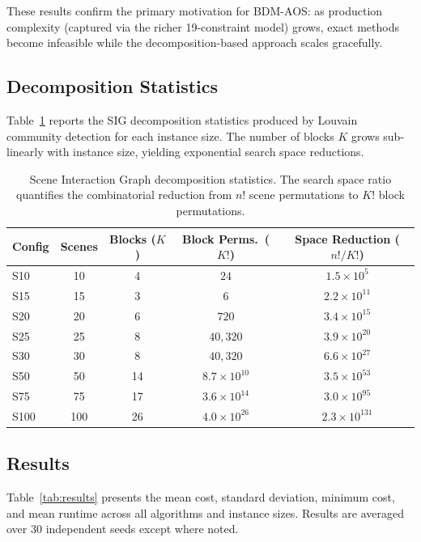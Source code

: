 These results confirm the primary motivation for BDM-AOS: as production complexity (captured via the richer 19-constraint model) grows, exact methods become infeasible while the decomposition-based approach scales gracefully.

\subsection{Decomposition Statistics}

Table~\ref{tab:decomposition} reports the SIG decomposition statistics produced by Louvain community detection for each instance size.
The number of blocks $K$ grows sub-linearly with instance size, yielding exponential search space reductions.

\begin{table}[h]
\centering
\caption{Scene Interaction Graph decomposition statistics. The search space ratio quantifies the combinatorial reduction from $n!$ scene permutations to $K!$ block permutations.}
\label{tab:decomposition}
\small
\begin{tabular}{lcccc}
\toprule
\textbf{Config} & \textbf{Scenes} & \textbf{Blocks ($K$)} & \textbf{Block Perms.\ ($K!$)} & \textbf{Space Reduction ($n!/K!$)} \\
\midrule
S10  & 10  & 4   & $24$                  & $1.5 \times 10^{5}$ \\
S15  & 15  & 3   & $6$                   & $2.2 \times 10^{11}$ \\
S20  & 20  & 6   & $720$                 & $3.4 \times 10^{15}$ \\
S25  & 25  & 8   & $40{,}320$            & $3.9 \times 10^{20}$ \\
S30  & 30  & 8   & $40{,}320$            & $6.6 \times 10^{27}$ \\
S50  & 50  & 14  & $8.7 \times 10^{10}$  & $3.5 \times 10^{53}$ \\
S75  & 75  & 17  & $3.6 \times 10^{14}$  & $3.0 \times 10^{95}$ \\
S100 & 100 & 26  & $4.0 \times 10^{26}$  & $2.3 \times 10^{131}$ \\
\bottomrule
\end{tabular}
\end{table}

\subsection{Results}

Table~\ref{tab:results} presents the mean cost, standard deviation, minimum cost, and mean runtime across all algorithms and instance sizes.
Results are averaged over 30 independent seeds except where noted.

